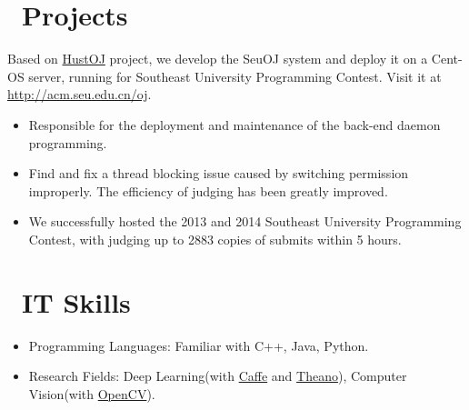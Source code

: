\documentclass{resume}
\begin{document}
\section{\faUsers\ Projects}
\begin{onehalfspacing}
Based on \href{https://github.com/zhblue/hustoj}{HustOJ} project, we develop the SeuOJ system and deploy it on a Cent-OS server, running for Southeast University Programming Contest.
Visit it at \href{http://acm.seu.edu.cn/oj/}{http://acm.seu.edu.cn/oj}.
\begin{itemize}
  \item Responsible for the deployment and maintenance of the back-end daemon programming.
  \item Find and fix a thread blocking issue caused by switching permission improperly. The efficiency of judging has been greatly improved.
  \item We successfully hosted the 2013 and 2014 Southeast University Programming Contest, with judging up to 2883 copies of submits within 5 hours.
\end{itemize}
\end{onehalfspacing}

\section{\faCogs\ IT Skills}
\begin{itemize}[parsep=0.5ex]
  \item Programming Languages: Familiar with C++, Java, Python.
  \item Research Fields: Deep Learning(with \href{http://caffe.berkeleyvision.org/}{Caffe} and \href{http://deeplearning.net/software/theano/}{Theano}), Computer Vision(with \href{http://opencv.org/}{OpenCV}).
\end{itemize}
\end{document}
